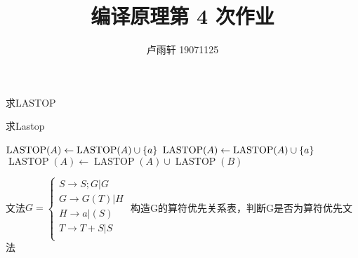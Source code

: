 \documentclass{ctexart}
\title{编译原理第 4 次作业}
\author{卢雨轩 19071125}
\DeclareMathOperator{\lastop}{LASTOP}
\DeclarePairedDelimiter{\set}{\{}{\}}
\begin{document}
\maketitle

\begin{outline}
    \1[6.] 求LASTOP \par

\begin{algorithm}[H]
    \caption{求Lastop}
    \begin{algorithmic}[1]
        \label{algo:1}
                \State $\lastop(A) \gets \lastop(A) \cup \set{a}$
            \EndFor
                \State $\lastop(A) \gets \lastop(A) \cup \set{a}$
            \EndFor
                \State $\lastop(A) \gets \lastop(A) \cup \lastop(B)$
            \EndFor
        \EndProcedure
    \end{algorithmic}
\end{algorithm}
    \1[9.] 文法$G = \begin{cases}
        S \to S; G | G \\
        G \to G(T) | H \\
        H \to a | (S) \\
        T \to T + S | S \\
    \end{cases}$
        \2[(1)] 构造G的算符优先关系表，判断G是否为算符优先文法
        

\end{outline}
\end{document}
